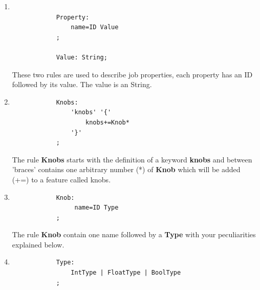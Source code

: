 \begin{enumerate}
    \item
		\singlespacing
		\begin{listing}[H]
		\begin{verbatim}

            Property:
                name=ID Value
            ;

            Value: String;
		\end{verbatim}
		\label{listing:modelRule}
		\end{listing}

        These two rules are used to describe job properties, each property has an
        ID followed by its value. The value is an String.

	\item
		\singlespacing
		\begin{listing}[H]
		\begin{verbatim}
			Knobs:
				'knobs' '{'
					knobs+=Knob*
				'}' 
			;
		\end{verbatim}
		\label{listing:modelRule}
		\end{listing}

		The rule \textbf{Knobs} starts with the definition of a keyword {\bf knobs}
		and between 'braces' contains one arbitrary number (*) of \textbf{Knob}
		which will be added (+=) to a feature called knobs.

	\item
		\singlespacing
		\begin{listing}[H]
		\begin{verbatim}
			Knob:
				 name=ID Type
			;
		\end{verbatim}
		\label{listing:modelRule}
		\end{listing}

		The rule \textbf{Knob} contain one name followed by a \textbf{Type} with
		your peculiarities explained below.

	\item
		\singlespacing
		\begin{listing}[H]
		\begin{verbatim}
			Type:
				IntType | FloatType | BoolType
			;
		\end{verbatim}
		\label{listing:modelRule}
		\end{listing}


\end{enumerate}
